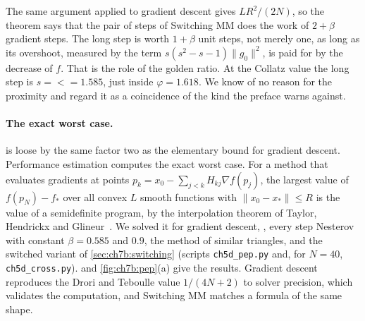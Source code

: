The same argument applied to gradient descent gives $LR^2/(2N)$, so the
theorem says that the pair of steps of Switching MM does the work of $2+\beta$
gradient steps. The long step is worth $1+\beta$ unit steps, not merely one,
as long as its overshoot, measured by the term $s(s^2-s-1)\|g_0\|^2$, is paid
for by the decrease of $f$. That is the role of the golden ratio. At the
Collatz value the long step is $s=\lt=1.585$, just inside $\varphi=1.618$. We
know of no reason for the proximity and regard it as a coincidence of the kind
the preface warns against.

\paragraph{The exact worst case.}  is loose by the same
factor two as the elementary bound for gradient descent. Performance
estimation computes the exact worst case. For a method that evaluates
gradients at points $p_k=x_0-\sum_{j<k}H_{kj}\nabla f(p_j)$, the largest value of
$f(p_N)-f_*$ over all convex $L$ smooth functions with $\|x_0-x_*\|\le R$ is the
value of a semidefinite program, by the interpolation theorem of Taylor,
Hendrickx and Glineur~\cite{taylor2017}. We solved it for gradient descent,
\smmdet, every step Nesterov with constant $\beta=0.585$ and $0.9$, the method
of similar triangles, and the switched variant of \cref{sec:ch7b:switching}
(scripts \texttt{ch5d\_pep.py} and, for $N=40$, \texttt{ch5d\_cross.py}).  and
\cref{fig:ch7b:pep}(a) give the results. Gradient descent reproduces the
Drori and Teboulle value $1/(4N+2)$ to solver precision, which validates the
computation, and Switching MM matches a formula of the same shape.


